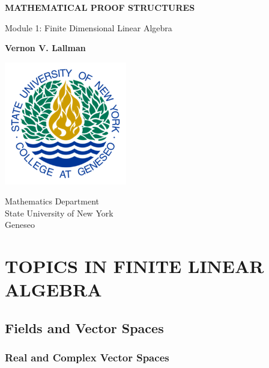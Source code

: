 \documentclass{book}
\theoremstyle{definition}
\theoremstyle{remark}
\begin{document}
\begin{titlepage}
    \begin{center}
        \vspace*{1cm}
        
        \textbf{MATHEMATICAL PROOF STRUCTURES}
        
        \vspace{0.5cm}
        Module 1: Finite Dimensional Linear Algebra
        
        \vspace{1.5cm}
        
        \textbf{Vernon V. Lallman}
        
        \vfill
        
        
        \vspace{0.8cm}
        
        \includegraphics[width=0.4\textwidth]{university}
        
        Mathematics Department\\
        State University of New York \\
        Geneseo\\
        \date{\today}
        
    \end{center}
\end{titlepage}

\tableofcontents

\newpage
\chapter{TOPICS IN FINITE LINEAR ALGEBRA}
\section{Fields and Vector Spaces}
\subsection{Real and Complex Vector Spaces}
\end{document}
